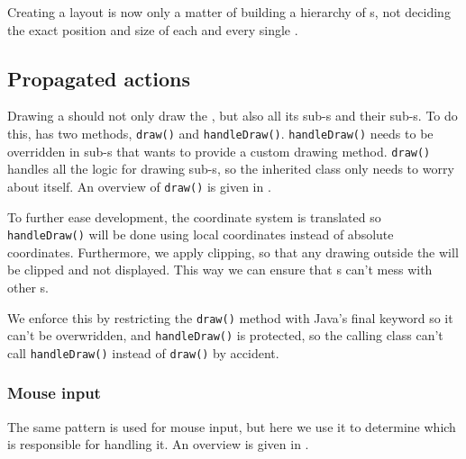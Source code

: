 
Creating a layout is now only a matter of building a hierarchy of
s, not deciding the exact position and size of each and every
single .

\subsection{Propagated actions}
\label{sec:actions}

Drawing a  should not only draw the , but also
all its sub-s and their sub-s. To do this,
 has two methods, \texttt{draw()} and \texttt{handleDraw()}.
\texttt{handleDraw()} needs to be overridden in sub-s that 
wants to provide a custom drawing method. \texttt{draw()} handles all the logic
for drawing sub-s, so the inherited class only needs to worry
about itself. An overview of \texttt{draw()} is given in
.



To further ease development, the coordinate system is translated so
\texttt{handleDraw()} will be done using local coordinates instead of absolute
coordinates.  Furthermore, we apply clipping, so that any drawing outside the
 will be clipped and not displayed. This way we can ensure that
s can't mess with other s.

We enforce this by restricting the \texttt{draw()} method with Java's final
keyword so it can't be overwridden, and \texttt{handleDraw()} is protected, so
the calling class can't call \texttt{handleDraw()} instead of \texttt{draw()} by
accident.

\subsubsection{Mouse input}

The same pattern is used for mouse input, but here we use it to determine which
 is responsible for handling it. An overview is given in
.


